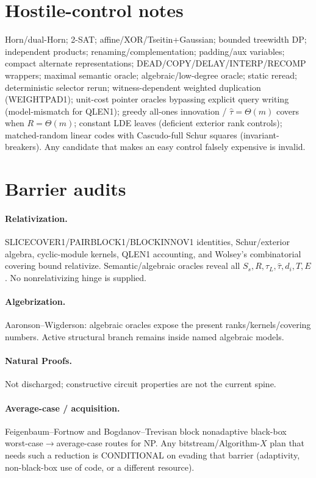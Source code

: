 \documentclass[11pt]{article}
\begin{document}
\section*{Hostile-control notes}
Horn/dual-Horn; 2-SAT; affine/XOR/Tseitin+Gaussian; bounded treewidth DP; independent products;
renaming/complementation; padding/aux variables; compact alternate representations;
DEAD/COPY/DELAY/INTERP/RECOMP wrappers; maximal semantic oracle; algebraic/low-degree oracle;
static reread; deterministic selector rerun; witness-dependent weighted duplication (WEIGHTPAD1);
unit-cost pointer oracles bypassing explicit query writing (model-mismatch for QLEN1);
greedy all-ones innovation / $\widehat\tau=\Theta(m)$ covers when $R=\Theta(m)$;
constant LDE leaves (deficient exterior rank controls);
matched-random linear codes with Cascudo-full Schur squares (invariant-breakers).
Any candidate that makes an easy control falsely expensive is invalid.

\section*{Barrier audits}
\paragraph{Relativization.}
SLICECOVER1/PAIRBLOCK1/BLOCKINNOV1 identities, Schur/exterior algebra, cyclic-module kernels,
QLEN1 accounting, and Wolsey's combinatorial covering bound relativize. Semantic/algebraic
oracles reveal all $S_s,R,\tau_L,\widehat\tau,d_i,T,E$. No nonrelativizing hinge is supplied.
\paragraph{Algebrization.}
Aaronson--Wigderson: algebraic oracles expose the present ranks/kernels/covering numbers.
Active structural branch remains inside named algebraic models.
\paragraph{Natural Proofs.}
Not discharged; constructive circuit properties are not the current spine.
\paragraph{Average-case / acquisition.}
Feigenbaum--Fortnow and Bogdanov--Trevisan block nonadaptive black-box worst-case$\to$average-case
routes for NP. Any bitstream/Algorithm-$X$ plan that needs such a reduction is CONDITIONAL on
evading that barrier (adaptivity, non-black-box use of code, or a different resource).
\end{document}
